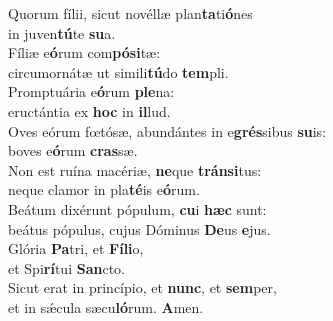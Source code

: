 \oddverse Quorum fílii, sicut novéllæ plan\textbf{ta}ti\textbf{ó}nes~\*\\
\oddverse in juven\textbf{tú}te \textbf{su}a.\\
\evenverse Fíliæ e\textbf{ó}rum com\textbf{pó}\textbf{si}tæ:~\*\\
\evenverse circumornátæ ut simili\textbf{tú}do \textbf{tem}pli.\\
\oddverse Promptuária e\textbf{ó}rum \textbf{ple}na:~\*\\
\oddverse eructántia ex \textbf{hoc} in \textbf{il}lud.\\
\evenverse Oves eórum fœtósæ, abundántes in e\textbf{grés}sibus \textbf{su}is:~\*\\
\evenverse boves e\textbf{ó}rum \textbf{cras}sæ.\\
\oddverse Non est ruína macériæ, \textbf{ne}que \textbf{trán}\textbf{si}tus:~\*\\
\oddverse neque clamor in pla\textbf{té}is e\textbf{ó}rum.\\
\evenverse Beátum dixérunt pópulum, \textbf{cu}i \textbf{hæc} sunt:~\*\\
\evenverse beátus pópulus, cujus Dóminus \textbf{De}us \textbf{e}jus.\\
\oddverse Glória \textbf{Pa}tri, et \textbf{Fí}\textbf{li}o,~\*\\
\oddverse et Spi\textbf{rí}tui \textbf{San}cto.\\
\evenverse Sicut erat in princípio, et \textbf{nunc}, et \textbf{sem}per,~\*\\
\evenverse et in sǽcula sæcu\textbf{ló}rum. \textbf{A}men.\\
